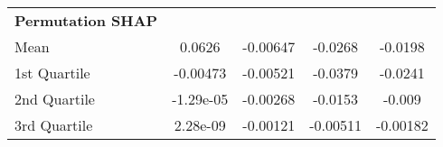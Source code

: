 {\begin{tabular} {lcccc}
\addlinespace[1ex] 
\textbf{Permutation SHAP} &  &  &  &  \\ 
\hspace{7pt}Mean & \cellcolor{bronze!60}0.0626 & -0.00647 & \cellcolor{bronze!60}-0.0268 & \cellcolor{bronze!60}-0.0198 \\ 
\hspace{7pt}1st Quartile & \cellcolor{bronze!60}-0.00473 & -0.00521 & \cellcolor{bronze!60}-0.0379 & -0.0241 \\ 
\hspace{7pt}2nd Quartile & \cellcolor{bronze!60}-1.29e-05 & -0.00268 & -0.0153 & -0.009 \\ 
\hspace{7pt}3rd Quartile & 2.28e-09 & -0.00121 & -0.00511 & -0.00182 \\ 
\bottomrule
\end{tabular}}